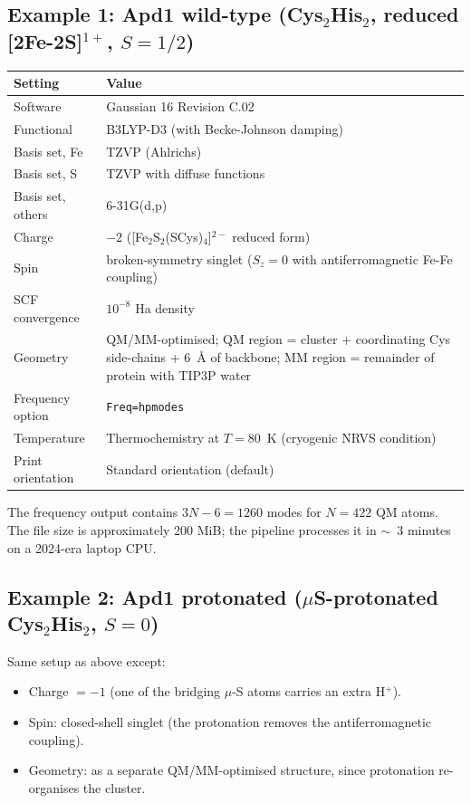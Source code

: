 \documentclass[10pt,a4paper,twoside]{article}
\begin{document}
\subsection{Example 1: Apd1 wild-type (Cys$_2$His$_2$, reduced [2Fe-2S]$^{1+}$, $S = 1/2$)}

\begin{longtable}{p{} p{}}
\toprule
\textbf{Setting} & \textbf{Value} \\
\midrule
Software             & Gaussian 16 Revision C.02 \\
Functional           & B3LYP-D3 (with Becke-Johnson damping) \\
Basis set, Fe        & TZVP (Ahlrichs) \\
Basis set, S         & TZVP with diffuse functions \\
Basis set, others    & 6-31G(d,p) \\
Charge               & $-2$ ([Fe$_2$S$_2$(SCys)$_4$]$^{2-}$ reduced
                       form) \\
Spin                 & broken-symmetry singlet ($S_z = 0$ with
                       antiferromagnetic Fe-Fe coupling) \\
SCF convergence      & $10^{-8}$ Ha density \\
Geometry             & QM/MM-optimised; QM region = cluster +
                       coordinating Cys side-chains + 6~\AA{} of
                       backbone; MM region = remainder of protein
                       with TIP3P water \\
Frequency option     & \texttt{Freq=hpmodes} \\
Temperature          & Thermochemistry at $T = 80$~K (cryogenic
                       NRVS condition) \\
Print orientation    & Standard orientation (default) \\
\bottomrule
\end{longtable}

The frequency output contains $3N - 6 = 1260$ modes for $N = 422$
QM atoms. The file size is approximately 200 MiB; the pipeline
processes it in $\sim$~3 minutes on a 2024-era laptop CPU.

\subsection{Example 2: Apd1 protonated ($\mu$S-protonated Cys$_2$His$_2$, $S = 0$)}

Same setup as above except:
\begin{itemize}
  \item Charge $= -1$ (one of the bridging $\mu$-S atoms carries
        an extra H$^+$).
  \item Spin: closed-shell singlet (the protonation removes the
        antiferromagnetic coupling).
  \item Geometry: as a separate QM/MM-optimised structure, since
        protonation re-organises the cluster.
\end{itemize}
\end{document}
